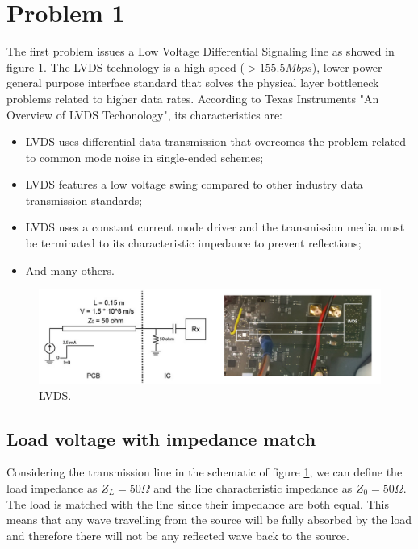 \section{Problem 1}

The first problem issues a Low Voltage Differential Signaling line as showed in figure \ref{lvds}. The LVDS technology is a high speed ($> 155.5 Mbps$), lower power general purpose interface standard that solves the physical layer bottleneck problems related to higher data rates. According to Texas Instruments "An Overview of LVDS Techonology", its characteristics are:

\begin{itemize}
    \item LVDS uses differential data transmission that overcomes the problem related to common mode noise in single-ended schemes;
    \item LVDS features a low voltage swing compared to other industry data transmission standards;
    \item LVDS uses a constant current mode driver and the transmission media must be terminated to its characteristic impedance to prevent reflections;
    \item And many others.
\end{itemize}


\begin{figure}[H] 
\centering
\includegraphics[width=14cm]{images/lvds.png}
\caption{LVDS.}
\label{lvds} 
\end{figure}

\subsection{Load voltage with impedance match}

Considering the transmission line in the schematic of figure \ref{lvds}, we can define the load impedance as $Z_L = 50 \Omega$ and the line characteristic impedance as $Z_0 = 50 \Omega$. The load is matched with the line since their impedance are both equal. This means that any wave travelling from the source will be fully absorbed by the load and therefore there will not be any reflected wave back to the source.

